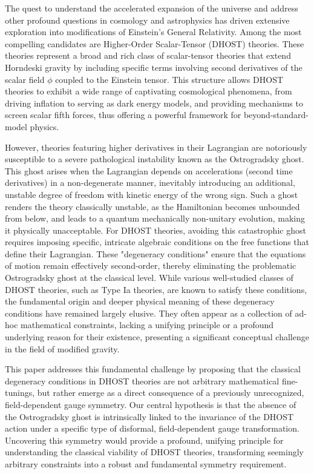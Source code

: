\documentclass[twocolumn]{aastex631}
\begin{document}
The quest to understand the accelerated expansion of the universe and address other profound questions in cosmology and astrophysics has driven extensive exploration into modifications of Einstein's General Relativity. Among the most compelling candidates are Higher-Order Scalar-Tensor (DHOST) theories. These theories represent a broad and rich class of scalar-tensor theories that extend Horndeski gravity by including specific terms involving second derivatives of the scalar field $\phi$ coupled to the Einstein tensor. This structure allows DHOST theories to exhibit a wide range of captivating cosmological phenomena, from driving inflation to serving as dark energy models, and providing mechanisms to screen scalar fifth forces, thus offering a powerful framework for beyond-standard-model physics.

However, theories featuring higher derivatives in their Lagrangian are notoriously susceptible to a severe pathological instability known as the Ostrogradsky ghost. This ghost arises when the Lagrangian depends on accelerations (second time derivatives) in a non-degenerate manner, inevitably introducing an additional, unstable degree of freedom with kinetic energy of the wrong sign. Such a ghost renders the theory classically unstable, as the Hamiltonian becomes unbounded from below, and leads to a quantum mechanically non-unitary evolution, making it physically unacceptable. For DHOST theories, avoiding this catastrophic ghost requires imposing specific, intricate algebraic conditions on the free functions that define their Lagrangian. These "degeneracy conditions" ensure that the equations of motion remain effectively second-order, thereby eliminating the problematic Ostrogradsky ghost at the classical level. While various well-studied classes of DHOST theories, such as Type Ia theories, are known to satisfy these conditions, the fundamental origin and deeper physical meaning of these degeneracy conditions have remained largely elusive. They often appear as a collection of ad-hoc mathematical constraints, lacking a unifying principle or a profound underlying reason for their existence, presenting a significant conceptual challenge in the field of modified gravity.

This paper addresses this fundamental challenge by proposing that the classical degeneracy conditions in DHOST theories are not arbitrary mathematical fine-tunings, but rather emerge as a direct consequence of a previously unrecognized, field-dependent gauge symmetry. Our central hypothesis is that the absence of the Ostrogradsky ghost is intrinsically linked to the invariance of the DHOST action under a specific type of disformal, field-dependent gauge transformation. Uncovering this symmetry would provide a profound, unifying principle for understanding the classical viability of DHOST theories, transforming seemingly arbitrary constraints into a robust and fundamental symmetry requirement.
\end{document}
